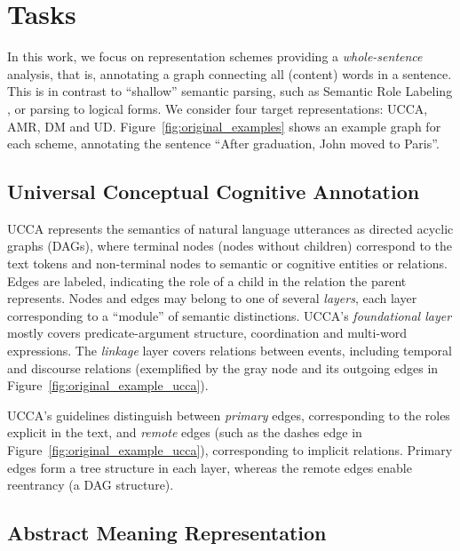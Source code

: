 \documentclass[11pt,a4paper]{article}
\begin{document}
\section{Tasks}\label{sec:tasks}

In this work, we focus on representation schemes providing a \textit{whole-sentence} analysis,
that is, annotating a graph connecting all (content) words in a sentence.
This is in contrast to ``shallow'' semantic parsing,
such as Semantic Role Labeling
\cite[SRL;][]{Palmer:05,gildea2002automatic,swayamdipta2017frame,ringgaard2017sling},
or parsing to logical forms.
We consider four target representations: UCCA, AMR, DM and UD.
Figure~\ref{fig:original_examples} shows an example graph for each scheme,
annotating the sentence ``After graduation, John moved to Paris''.

\subsection{Universal Conceptual Cognitive Annotation}\label{sec:ucca}

UCCA \cite{abend2013universal} represents the semantics of natural language utterances
as directed acyclic graphs (DAGs), where terminal nodes (nodes without children)
correspond to the text tokens and
non-terminal nodes to semantic or cognitive entities or relations.
Edges are labeled, indicating the role of a child in the relation the parent represents.
Nodes and edges may belong to one of several \textit{layers}, each layer corresponding
to a ``module'' of semantic distinctions.
UCCA's \textit{foundational layer} mostly covers predicate-argument
structure, coordination and multi-word expressions.
The \textit{linkage} layer covers relations between events, including temporal and discourse relations
(exemplified by the gray node and its outgoing edges in Figure~\ref{fig:original_example_ucca}).

UCCA's guidelines distinguish between \textit{primary} edges, corresponding to the roles explicit
in the text, and \textit{remote} edges (such as the dashes edge in
Figure~\ref{fig:original_example_ucca}), corresponding to implicit relations.
Primary edges form a tree structure in each layer,
whereas the remote edges enable reentrancy (a DAG structure).


\subsection{Abstract Meaning Representation}\label{sec:amr}
\end{document}
